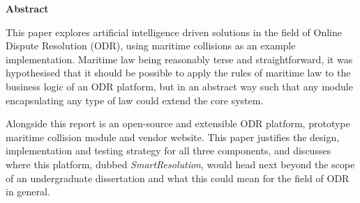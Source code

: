\thispagestyle{empty}

\begin{center}
    {\LARGE\bf Abstract}
\end{center}

This paper explores artificial intelligence driven solutions in the field of Online Dispute Resolution (ODR), using maritime collisions as an example implementation. Maritime law being reasonably terse and straightforward, it was hypothesised that it should be possible to apply the rules of maritime law to the business logic of an ODR platform, but in an abstract way such that any module encapsulating any type of law could extend the core system.

Alongside this report is an open-source and extensible ODR platform, prototype maritime collision module and vendor website. This paper justifies the design, implementation and testing strategy for all three components, and discusses where this platform, dubbed \emph{SmartResolution}, would head next beyond the scope of an undergraduate dissertation and what this could mean for the field of ODR in general.